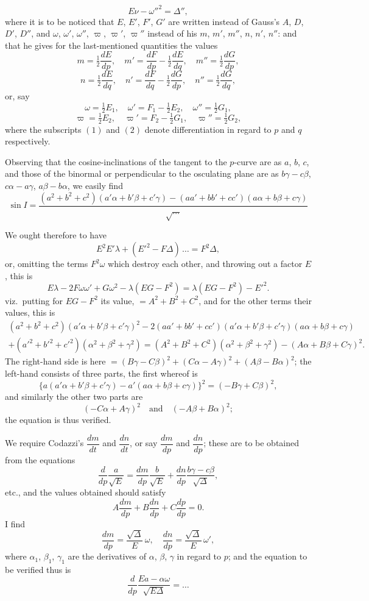 \documentclass[11pt,a4paper]{book}
\begin{document}
{{{\[E\nu - \omega''^2 = \Delta'',
\]
where it is to be noticed that $E$, $E'$, $F'$, $G'$ are written instead of Gauss's $A$, $D$, $D'$, $D''$,
and $\omega$, $\omega'$, $\omega''$, $\varpi$, $\varpi'$, $\varpi''$ instead of his $m$, $m'$, $m''$, $n$, $n'$, $n''$:
and that he gives for the last-mentioned quantities the values
\[
m = \tfrac12\frac{dE}{dp}, \quad m' = \frac{dF}{dp} - \tfrac12\frac{dE}{dq}, \quad
m'' = \tfrac12\frac{dG}{dp},
\]
\[
n = \tfrac12\frac{dE}{dq}, \quad n' = \frac{dF}{dq} - \tfrac12\frac{dG}{dp}, \quad
n'' = \tfrac12\frac{dG}{dq},
\]
or, say
\[
\omega = \tfrac12 E_1, \quad \omega' = F_1 - \tfrac12 E_2, \quad \omega'' = \tfrac12 G_1,
\]
\[
\varpi = \tfrac12 E_2, \quad \varpi' = F_2 - \tfrac12 G_1, \quad \varpi'' = \tfrac12 G_2,
\]
where the subscripts $(1)$ and $(2)$ denote differentiation in regard to $p$ and $q$ respectively.

Observing that the cosine-inclinations of the tangent to the $p$-curve are as $a$, $b$, $c$,
and those of the binormal or perpendicular to the osculating plane are as $b\gamma - c\beta$,
$c\alpha - a\gamma$, $a\beta - b\alpha$, we easily find
\[
\sin I = \frac{(a^2+b^2+c^2)(a'\alpha+b'\beta+c'\gamma) - (aa'+bb'+cc')(a\alpha+b\beta+c\gamma)}{\sqrt{\ldots}}
\]

We ought therefore to have
\[
E^2E'\lambda + (E'^2 - F\Delta)\,\ldots = F^2\Delta,
\]
or, omitting the terms $F^2\omega$ which destroy each other, and throwing out a factor $E$,
this is
\[
E\lambda - 2F\omega\omega' + G\omega^2 - \lambda(EG-F^2)
= \lambda(EG-F^2) - E'^2.
\]
viz.\ putting for $EG-F^2$ its value, $=A^2+B^2+C^2$, and for the other terms their
values, this is
\begin{multline*}
(a^2+b^2+c^2)(a'\alpha+b'\beta+c'\gamma)^2
- 2(aa'+bb'+cc')(a'\alpha+b'\beta+c'\gamma)(a\alpha+b\beta+c\gamma)\\
+(a'^2+b'^2+c'^2)(\alpha^2+\beta^2+\gamma^2)
= (A^2+B^2+C^2)(\alpha^2+\beta^2+\gamma^2) - (A\alpha+B\beta+C\gamma)^2.
\end{multline*}
The right-hand side is here $= (B\gamma - C\beta)^2 + (C\alpha - A\gamma)^2 + (A\beta - B\alpha)^2$;
the left-hand consists of three parts, the first whereof is
\[
\{a(a'\alpha+b'\beta+c'\gamma) - a'(a\alpha+b\beta+c\gamma)\}^2 = (-B\gamma + C\beta)^2,
\]
and similarly the other two parts are
\[
(-C\alpha + A\gamma)^2 \quad \text{and} \quad (-A\beta + B\alpha)^2;
\]
the equation is thus verified.

We require Codazzi's $\dfrac{dm}{dt}$ and $\dfrac{dn}{dt}$, or say $\dfrac{dm}{dp}$ and $\dfrac{dn}{dp}$;
these are to be obtained from the equations
\[
\frac{d}{dp}\frac{a}{\sqrt{E}} = \frac{dm}{dp}\frac{b}{\sqrt{E}} + \frac{dn}{dp}\frac{b\gamma-c\beta}{\sqrt{\Delta}},
\]
etc., and the values obtained should satisfy
\[
A\frac{dm}{dp} + B\frac{dn}{dp} + C\frac{dp}{dp} = 0.
\]
I find
\[
\frac{dm}{dp} = \frac{\sqrt{\Delta}}{E}\,\omega, \quad
\frac{dn}{dp} = \frac{\sqrt{\Delta}}{E}\,\omega',
\]
where $\alpha_1$, $\beta_1$, $\gamma_1$ are the derivatives of $\alpha$, $\beta$, $\gamma$ in regard to $p$;
and the equation to be verified thus is
\[
\frac{d}{dp}\frac{Ea - \alpha\omega}{\sqrt{E\Delta}} = \ldots
\]

}}}
\end{document}

